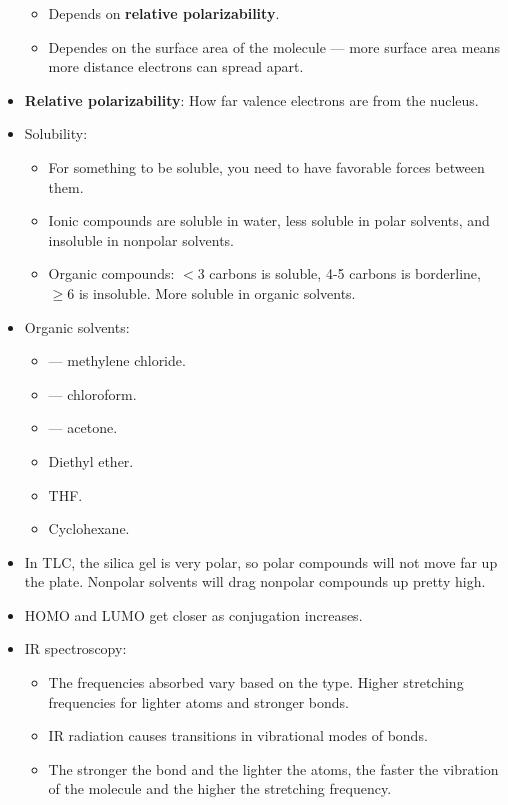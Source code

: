 \documentclass[../notes.tex]{subfiles}
\begin{document}
\begin{itemize}
\begin{itemize}
        \item Depends on \textbf{relative polarizability}.
        \item Dependes on the surface area of the molecule --- more surface area means more distance electrons can spread apart.
    \end{itemize}
    \item \textbf{Relative polarizability}: How far valence electrons are from the nucleus.
    \item Solubility:
    \begin{itemize}
        \item For something to be soluble, you need to have favorable forces between them.
        \item Ionic compounds are soluble in water, less soluble in polar solvents, and insoluble in nonpolar solvents.
        \item Organic compounds: $<3$ carbons is soluble, 4-5 carbons is borderline, $\geq 6$ is insoluble. More soluble in organic solvents.
    \end{itemize}
    \item Organic solvents:
    \begin{itemize}
        \item {} --- methylene chloride.
        \item {} --- chloroform.
        \item {} --- acetone.
        \item Diethyl ether.
        \item THF.
        \item Cyclohexane.
    \end{itemize}
    \item In TLC, the silica gel is very polar, so polar compounds will not move far up the plate. Nonpolar solvents will drag nonpolar compounds up pretty high.
    \item HOMO and LUMO get closer as conjugation increases.
    \item IR spectroscopy:
    \begin{itemize}
        \item The frequencies absorbed vary based on the type. Higher stretching frequencies for lighter atoms and stronger bonds.
        \item IR radiation causes transitions in vibrational modes of bonds.
        \item The stronger the bond and the lighter the atoms, the faster the vibration of the molecule and the higher the stretching frequency.

\end{itemize}
\end{itemize}
\end{document}
